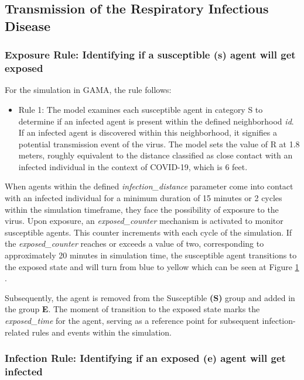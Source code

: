 \subsection{Transmission of the Respiratory Infectious Disease}
 \subsubsection{Exposure Rule: Identifying if a susceptible (s) agent will get exposed}
 
 
 For the simulation in GAMA, the rule follows:
 \begin{itemize}
 	\begin{figure}[H]
 		\centering
 		\texttt{[image: images/exposed.png]}
 		\caption{ Snapshot of an exposed agent within the GAMA simulation at a specific time.}
 		\label{exposed}
 	\end{figure}
 	\item Rule 1: The model examines each susceptible agent in category S to determine if an infected agent is present within the defined neighborhood \textit{id}. If an infected agent is discovered within this neighborhood, it signifies a potential transmission event of the virus. The model sets the value of R at 1.8 meters, roughly equivalent to the distance classified as close contact with an infected individual in the context of COVID-19, which is 6 feet.
 \end{itemize}
 When agents within the defined \textit{infection\_distance} parameter come into contact with an infected individual for a minimum duration of 15 minutes or 2 cycles within the simulation timeframe, they face the possibility of exposure to the virus. Upon exposure, an \textit{exposed\_counter} mechanism is activated to monitor susceptible agents. This counter increments with each cycle of the simulation. If the \textit{exposed\_counter} reaches or exceeds a value of two, corresponding to approximately 20 minutes in simulation time, the susceptible agent transitions to the exposed state and will turn from blue to yellow which can be seen at Figure \ref{exposed} . 
 
 Subsequently, the agent is removed from the Susceptible \textbf{(S)} group and added in the group \textbf{E}. The moment of transition to the exposed state marks the \textit{exposed\_time} for the agent, serving as a reference point for subsequent infection-related rules and events within the simulation. \\
 
  \subsubsection{Infection Rule: Identifying if an exposed (e) agent will get infected}
 
